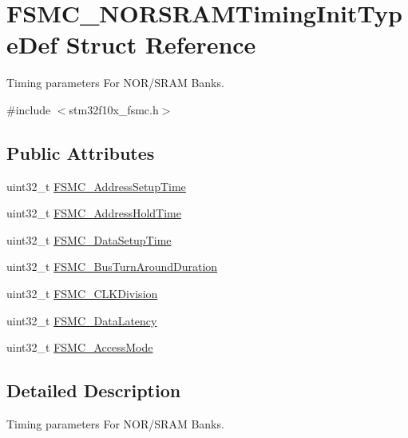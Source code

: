 \hypertarget{structFSMC__NORSRAMTimingInitTypeDef}{
\section{FSMC\_\-NORSRAMTimingInitTypeDef Struct Reference}
\label{structFSMC__NORSRAMTimingInitTypeDef}
}


Timing parameters For NOR/SRAM Banks.  




{\ttfamily \#include $<$stm32f10x\_\-fsmc.h$>$}

\subsection*{Public Attributes}
\begin{DoxyCompactItemize}
\item 
uint32\_\-t \hyperlink{structFSMC__NORSRAMTimingInitTypeDef_a2ba90f4ec16bc38a2c4fa29c593b713b}{FSMC\_\-AddressSetupTime}
\item 
uint32\_\-t \hyperlink{structFSMC__NORSRAMTimingInitTypeDef_a917b227ccb0a765791897ce3647ab26b}{FSMC\_\-AddressHoldTime}
\item 
uint32\_\-t \hyperlink{structFSMC__NORSRAMTimingInitTypeDef_aaa0a9178766adeed424d5c4eb728d1b1}{FSMC\_\-DataSetupTime}
\item 
uint32\_\-t \hyperlink{structFSMC__NORSRAMTimingInitTypeDef_a3d98d57618e46ec6aa5d876dcc047d32}{FSMC\_\-BusTurnAroundDuration}
\item 
uint32\_\-t \hyperlink{structFSMC__NORSRAMTimingInitTypeDef_a251b439331b82eecea58aa3f8882ea15}{FSMC\_\-CLKDivision}
\item 
uint32\_\-t \hyperlink{structFSMC__NORSRAMTimingInitTypeDef_abc33886615fc3627448aa2dba11cfc77}{FSMC\_\-DataLatency}
\item 
uint32\_\-t \hyperlink{structFSMC__NORSRAMTimingInitTypeDef_a261d043a19cecf77e6859403be204efc}{FSMC\_\-AccessMode}
\end{DoxyCompactItemize}


\subsection{Detailed Description}
Timing parameters For NOR/SRAM Banks. 

